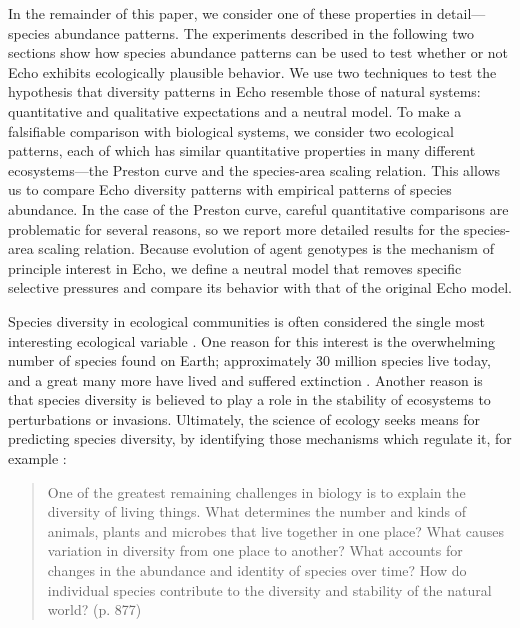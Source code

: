 In the remainder of this paper, we consider one of these properties in
detail---species abundance patterns.  The experiments described in the
following two sections show how species abundance patterns can be used
to test whether or not Echo exhibits ecologically plausible behavior.
We use two techniques to test the hypothesis that diversity patterns
in Echo resemble those of natural systems: quantitative and
qualitative expectations and a neutral model.  To make a falsifiable
comparison with biological systems, we consider two ecological
patterns, each of which has similar quantitative properties in many
different ecosystems---the Preston curve and the species-area scaling
relation.  This allows us to compare Echo diversity patterns with
empirical patterns of species abundance.  In the case of the Preston
curve, careful quantitative comparisons are problematic for
several reasons, so we report more detailed results for the
species-area scaling relation.  Because evolution of agent genotypes
is the mechanism of principle interest in Echo, we define a neutral
model that removes specific selective pressures and compare
its behavior with that of the original Echo model.


 
Species diversity in ecological communities is often considered the
single most interesting ecological variable
\cite{Hutchinson59,May75,May86,Brown81}.  One reason for this interest
is the overwhelming number of species found on Earth; approximately 30
million species live today, and a great many more have lived and
suffered extinction \cite{Brown94,Raup91}.  Another reason is that
species diversity is believed to play a role in the stability of
ecosystems to perturbations or invasions.  Ultimately, the science of
ecology seeks means for predicting species diversity, by identifying
those mechanisms which regulate it, for example \cite{Brown81}:
\begin{quote}
  One of the greatest remaining challenges in biology is to explain
  the diversity of living things.  What determines the number and
  kinds of animals, plants and microbes that live together in one
  place?  What causes variation in diversity from one place to
  another?  What accounts for changes in the abundance and identity of
  species over time?  How do individual species contribute to the
  diversity and stability of the natural world? (p. 877)
\end{quote}
 
